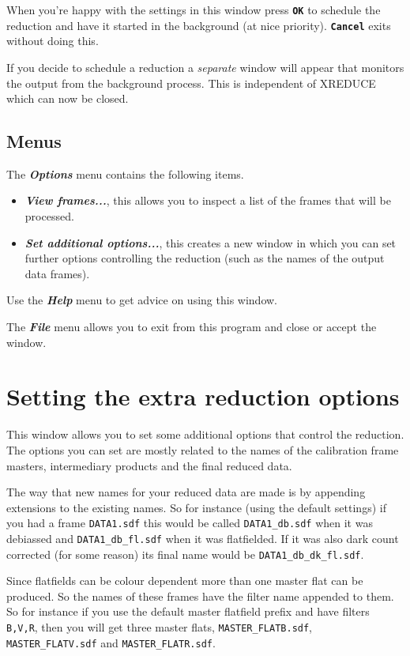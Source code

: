 \documentclass[11pt]{article}
\newcommand{\xlabel}[1]{}
\newcommand{\butt}[1]{{\bf \tt #1}}
\newcommand{\menu}[1]{{\bf \em #1}}
\newcommand{\text}[1]{{\tt #1}}
\begin{document}
\xlabel{CCDReduceOK}

When you're happy with the settings in this window press \butt{OK} to
schedule the reduction and have it started in the background (at nice
priority). \butt{Cancel} exits without doing this. 

If you decide to schedule a reduction a {\em separate} window will 
appear that monitors the output from the background process. This 
is independent of XREDUCE which can now be closed.

\subsection{Menus \xlabel{CCDReduceMenu}}
The \menu{Options} menu contains the following items.
\begin{itemize}
\item \menu{View frames...}, this allows you to inspect a list of the
frames that will be processed.
\item \menu{Set additional options...}, this creates a new window in
which you can set further options controlling the reduction (such as
the names of the output data frames).
\end{itemize}

Use the \menu{Help} menu to get advice on using this window.

The \menu{File} menu allows you to exit from this program and close or
accept the window.

\section{Setting the extra reduction options \xlabel{CCDReduceExtrasWindow}}
This window allows you to set some additional options that control the
reduction. The options you can set are mostly related to the
names of the calibration frame masters, intermediary products and the
final reduced data.

The way that new names for your reduced data are made is by appending
extensions to the existing names. So for instance (using the default
settings) if you had a frame \text{DATA1.sdf} this would be called
\text{DATA1\_db.sdf} when it was debiassed and \text{DATA1\_db\_fl.sdf} when
it was flatfielded. If it was also dark count corrected (for some
reason) its final name would be \text{DATA1\_db\_dk\_fl.sdf}.

Since flatfields can be colour dependent more than one master flat can
be produced. So the names of these frames have the filter name appended
to them. So for instance if you use the default master flatfield
prefix and have filters \text{B,V,R}, then you will get three master
flats, \text{MASTER\_FLATB.sdf}, \text{MASTER\_FLATV.sdf} and
\text{MASTER\_FLATR.sdf}.
\end{document}
